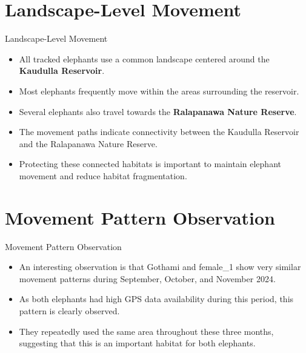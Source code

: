 \documentclass{beamer}
\begin{document}
	\section{Landscape-Level Movement}
	\begin{frame}{Landscape-Level Movement}
		
		\large
		\begin{itemize}
			\item All tracked elephants use a common landscape centered around the \textbf{Kaudulla Reservoir}.
			\vspace{0.2cm}
			\item Most elephants frequently move within the areas surrounding the reservoir.
			\vspace{0.2cm}
			\item Several elephants also travel towards the \textbf{Ralapanawa Nature Reserve}.
			\vspace{0.2cm}
			\item The movement paths indicate connectivity between the Kaudulla Reservoir and the Ralapanawa Nature Reserve.
			\vspace{0.2cm}
			\item Protecting these connected habitats is important to maintain elephant movement and reduce habitat fragmentation.
		\end{itemize}
	\end{frame}
	
	
	
	
	\section{Movement Pattern Observation}
	\begin{frame}{Movement Pattern Observation}
		\Large
		
		\begin{itemize}
		\item An interesting observation is that Gothami and female\_1 show very similar movement patterns during September, October, and November 2024.
		
		\vspace{0.7cm}
		
		\item As both elephants had high GPS data availability during this period, this pattern is clearly observed.
		
		\vspace{0.7cm}
		
		\item They repeatedly used the same area throughout these three months, suggesting that this is an important habitat for both elephants.
	    \end{itemize}
	\end{frame}
	
\end{document}
